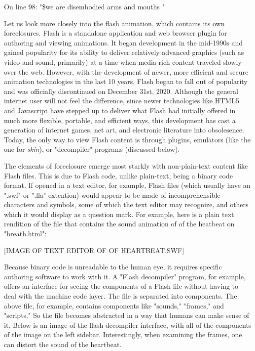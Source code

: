 \documentclass[11pt]{article}
\begin{document}
\begin{enumerate}
On line 98: "\$we are disembodied arms and mouths "

Let us look more closely into the flash animation, which contains its
own foreclosures. Flash is a standalone application and web browser
plugin for authoring and viewing animations. It began development in
the mid-1990s and gained popularity for its ability to deliver
relatively advanced graphics (such as video and sound, primarily) at a
time when media-rich content traveled slowly over the web. However,
with the development of newer, more efficient and secure animation
technologies in the last 10 years, Flash began to fall out of
popularity and was officially discontinued on December
31st, 2020. Although the general internet user will not feel the
difference, since newer technologies like HTML5 and Javascript have
stepped up to deliver what Flash had initially offered in much more
flexible, portable, and efficient ways, this development has cast a
generation of internet games, net art, and electronic literature into
obsolesence. Today, the only way to view Flash content is through
plugins, emulators (like the one for \emph{skin}), or "decompiler" programs
(discussed below).

The elements of foreclosure emerge most starkly with non-plain-text
content like Flash files. This is due to Flash code, unlike
plain-text, being a binary code format. If opened in a text editor,
for example, Flash files (which usually have an ".swf" or ".fla"
extention) would appear to be made of incomprehensible characters and
symbols, some of which the text editor may recognize, and others which
it would display as a question mark. For example, here is a plain text
rendition of the file that contains the sound animation of of the
heatbeat on "breath.html":

[IMAGE OF TEXT EDITOR OF OF HEARTBEAT.SWF]

Because binary code is unreadable to the human eye, it requires
specific authoring software to work with it. A "Flash decompiler"
program, for example, offers an interface for seeing the components of
a Flash file without having to deal with the machine code layer. The
file is separated into components. The above file, for example,
contains components like "sounds," "frames," and "scripts." So the
file becomes abstracted in a way that humans can make sense of
it. Below is an image of the flash decompiler interface, with all of
the components of the image on the left sidebar. Interestingly, when
examining the frames, one can distort the sound of the heartbeat.


\end{enumerate}
\end{document}
